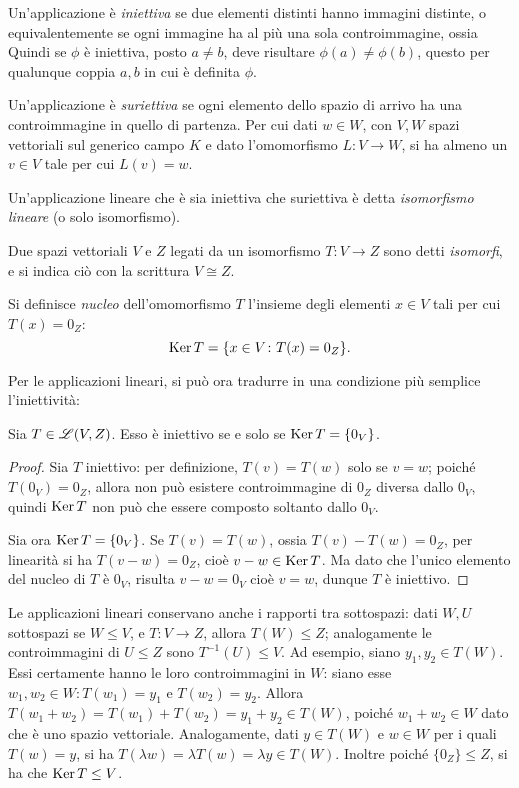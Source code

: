Un'applicazione è \emph{iniettiva} se due elementi distinti hanno immagini distinte, o equivalentemente se ogni immagine ha al più una sola controimmagine, ossia
Quindi se $\phi$ è iniettiva, posto $  a\neq   b$, deve risultare $\phi(  a)\neq\phi(  b)$, questo per qualunque coppia $  a,  b$ in cui è definita $\phi$.

Un'applicazione è \emph{suriettiva} se ogni elemento dello spazio di arrivo ha una controimmagine in quello di partenza.
Per cui dati $  w\in W$, con $V,W$ spazi vettoriali sul generico campo $K$ e dato l'omomorfismo $L\colon V\to W$, si ha almeno un $  v\in V$ tale per cui $L(  v) =   w$. 

\begin{definizione} \label{d:isomorfismo-lineare}
	Un'applicazione lineare che è sia iniettiva che suriettiva è detta \emph{isomorfismo lineare} (o solo isomorfismo).
\end{definizione}
Due spazi vettoriali $V$ e $Z$ legati da un isomorfismo $T\colon V\to Z$ sono detti \emph{isomorfi}, e si indica ciò con la scrittura $V\cong Z$.

\begin{definizione} \label{d:nucleo-applicazione-lineare}
	Si definisce \emph{nucleo} dell'omomorfismo $T$ l'insieme degli elementi $  x\in V$ tali per cui $T(  x)=0_Z$:
	\begin{equation*}
		\operatorname{Ker} T=\{  x\in V\colon T(  x)=0_Z\}.
	\end{equation*}
\end{definizione}

Per le applicazioni lineari, si può ora tradurre in una condizione più semplice l'iniettività:
\begin{teorema} \label{t:iniettivita-nucleo}
	Sia $T\in\mathscr L(V,Z)$.
	Esso è iniettivo se e solo se $\operatorname{Ker} T=\{0_V\}$.
\end{teorema}
\begin{proof}
	Sia $T$ iniettivo: per definizione, $T(  v)=T(  w)$ solo se $  v=  w$; poiché $T(0_V)=0_Z$, allora non può esistere controimmagine di $0_Z$ diversa dallo $0_V$, quindi $\operatorname{Ker} T$ non può che essere composto soltanto dallo $0_V$.

	Sia ora $\operatorname{Ker} T=\{0_V\}$.
	Se $T(  v)=T(  w)$, ossia $T(  v)-T(  w)=0_Z$, per linearità si ha $T(  v-  w)=0_Z$, cioè $  v-  w\in\operatorname{Ker} T$.
	Ma dato che l'unico elemento del nucleo di $T$ è $0_V$, risulta $  v-  w=0_V$ cioè $  v=  w$, dunque $T$ è iniettivo.
\end{proof}
Le applicazioni lineari conservano anche i rapporti tra sottospazi: dati $W,U$ sottospazi se $W\leq V$, e $T\colon V\to Z$, allora $T(W)\leq Z$; analogamente le controimmagini di $U\leq Z$ sono $T^{-1}(U)\leq V$.
Ad esempio, siano $  y_1,  y_2\in T(W)$.
Essi certamente hanno le loro controimmagini in $W$: siano esse $  w_1,  w_2\in W\colon T(  w_1)=  y_1$ e $T(  w_2)=  y_2$.
Allora $T(  w_1+  w_2)=T(  w_1)+T(  w_2)=  y_1+  y_2\in T(W)$, poiché $  w_1+  w_2\in W$ dato che è uno spazio vettoriale.
Analogamente, dati $  y\in T(W)$ e $  w\in W$ per i quali $T(  w)=  y$, si ha $T(\lambda  w)=\lambda T(  w)=\lambda  y\in T(W)$.
Inoltre poiché $\{0_Z\}\leq Z$, si ha che $\operatorname{Ker} T\leq V$.


